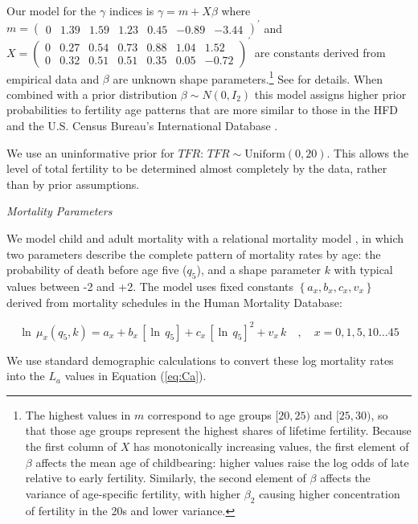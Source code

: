 \documentclass[12pt]{article}
\begin{document}
Our model for the \(\gamma\) indices is \(\gamma=m+X\beta\) where
\(m=(\begin{smallmatrix} 0 &1.39 &1.59 &1.23 &0.45 &-0.89 &-3.44\end{smallmatrix})^\prime\)
and
\(X= \left(\begin{smallmatrix}0 & 0.27 & 0.54 & 0.73 & 0.88 & 1.04 & 1.52\\0 & 0.32 & 0.51 & 0.51 & 0.35 & 0.05 & -0.72 \end{smallmatrix}\right)^{\prime}\)
are constants derived from empirical data and \(\beta\) are unknown
shape
parameters.\footnote{The highest values in $m$ correspond to age groups $[20,25)$ and $[25,30)$, so that those age groups represent the highest shares of lifetime fertility. Because the first column of $X$ has monotonically increasing values, the first element of $\beta$ affects the mean age of childbearing: higher values raise the log odds of late relative to early fertility. Similarly, the second element of $\beta$ affects the variance of age-specific fertility, with higher $\beta_2$ causing higher concentration of fertility in the 20s and lower variance.}
See \citep{schmertmann2019bayesian} for details. When combined with a
prior distribution \(\beta\sim N(0,I_2)\) this model assigns higher
prior probabilities to fertility age patterns that are more similar to
those in the HFD and the U.S. Census Bureau's International Database
\citep{CensusIDB}.

We use an uninformative prior for \(TFR\):
\(TFR\sim \text{Uniform}(0,20)\). This allows the level of total
fertility to be determined almost completely by the data, rather than by
prior assumptions.

\emph{Mortality Parameters}

We model child and adult mortality with a relational mortality model
\citep{wilmoth2012flexible}, in which two parameters describe the
complete pattern of mortality rates by age: the probability of death
before age five (\(q_5\)), and a shape parameter \(k\) with typical
values between -2 and +2. The model uses fixed constants
\(\left\{a_x,b_x,c_x,v_x\right\}\) derived from mortality schedules in
the Human Mortality Database:

\begin{equation}
\ln\,\mu_{x}(q_{5},k) = a_{x}+b_{x}\,\left[\ln\, q_{5}\right]+c_{x}\,\left[\ln\, q_{5}\right]^{2}+v_{x}\, k\quad,\quad x=0,1,5,10 \ldots 45
\end{equation}

\noindent We use standard demographic calculations to convert these log
mortality rates into the \(L_{a}\) values in Equation (\ref{eq:Ca}).
\end{document}
